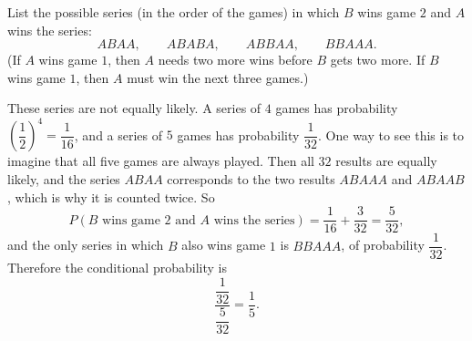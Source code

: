 List the possible series (in the order of the games) in which $B$ wins game $2$ and $A$ wins the series:
\[
ABAA,\qquad ABABA,\qquad ABBAA,\qquad BBAAA .
\]
(If $A$ wins game $1$, then $A$ needs two more wins before $B$ gets two more. If $B$ wins game $1$, then $A$ must win the next three games.)

These series are not equally likely. A series of $4$ games has probability $\left(\dfrac{1}{2}\right)^4=\dfrac{1}{16}$, and a series of $5$ games has probability $\dfrac{1}{32}$. One way to see this is to imagine that all five games are always played. Then all $32$ results are equally likely, and the series $ABAA$ corresponds to the two results $ABAAA$ and $ABAAB$, which is why it is counted twice. So
\[
P(B\text{ wins game }2\text{ and }A\text{ wins the series})=\dfrac{1}{16}+\dfrac{3}{32}=\dfrac{5}{32},
\]
and the only series in which $B$ also wins game $1$ is $BBAAA$, of probability $\dfrac{1}{32}$. Therefore the conditional probability is
\[
\dfrac{\dfrac{1}{32}}{\dfrac{5}{32}}=\boxed{\dfrac{1}{5}}.
\]
